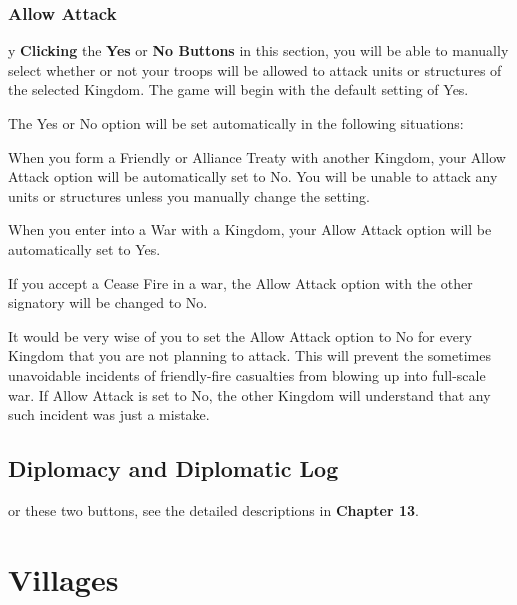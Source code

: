 \subsubsection{\textsf{Allow Attack}}



y \textbf{Clicking} the \textbf{Yes} or \textbf{No Buttons} in this section, you will be able to manually select whether or not your troops will be allowed to attack units or structures of the selected Kingdom. The game will begin with the default setting of Yes.

The Yes or No option will be set automatically in the following situations:

\begin{changemargin}{.1cm}{0cm} %

    
When you form a Friendly or Alliance Treaty with another Kingdom, your Allow Attack option will be automatically set to No. You will be unable to attack any units or structures unless you manually change the setting.

When you enter into a War with a Kingdom, your Allow Attack option will be automatically set to Yes.

If you accept a Cease Fire in a war, the Allow Attack option with the other signatory will be changed to No.
\end{changemargin}


It would be very wise of you to set the Allow Attack option to No for every Kingdom that you are not planning to attack. This will prevent the sometimes unavoidable incidents of friendly-fire casualties from blowing up into full-scale war. If Allow Attack is set to No, the other Kingdom will understand that any such incident was just a mistake.

\subsection{\textsf{Diplomacy and Diplomatic Log}}

or these two buttons, see the detailed descriptions in \textbf{Chapter 13}.

\section{\textsf{Villages}}

